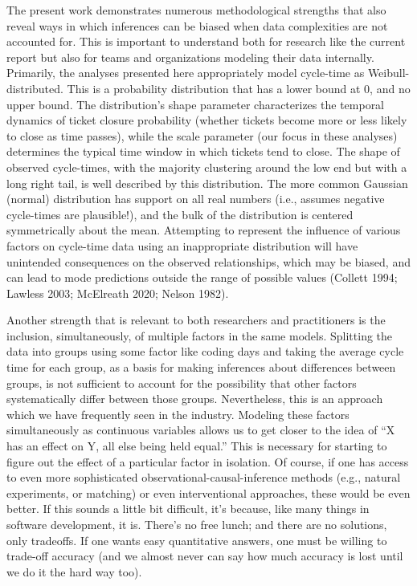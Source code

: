 \documentclass[
]{article}
\begin{document}
The present work demonstrates numerous methodological strengths that
also reveal ways in which inferences can be biased when data
complexities are not accounted for. This is important to understand both
for research like the current report but also for teams and
organizations modeling their data internally. Primarily, the analyses
presented here appropriately model cycle-time as Weibull-distributed.
This is a probability distribution that has a lower bound at 0, and no
upper bound. The distribution's shape parameter characterizes the
temporal dynamics of ticket closure probability (whether tickets become
more or less likely to close as time passes), while the scale parameter
(our focus in these analyses) determines the typical time window in
which tickets tend to close. The shape of observed cycle-times, with the
majority clustering around the low end but with a long right tail, is
well described by this distribution. The more common Gaussian (normal)
distribution has support on all real numbers (i.e., assumes negative
cycle-times are plausible!), and the bulk of the distribution is
centered symmetrically about the mean. Attempting to represent the
influence of various factors on cycle-time data using an inappropriate
distribution will have unintended consequences on the observed
relationships, which may be biased, and can lead to mode predictions
outside the range of possible values (Collett 1994; Lawless 2003;
McElreath 2020; Nelson 1982).

Another strength that is relevant to both researchers and practitioners
is the inclusion, simultaneously, of multiple factors in the same
models. Splitting the data into groups using some factor like coding
days and taking the average cycle time for each group, as a basis for
making inferences about differences between groups, is not sufficient to
account for the possibility that other factors systematically differ
between those groups. Nevertheless, this is an approach which we have
frequently seen in the industry. Modeling these factors simultaneously
as continuous variables allows us to get closer to the idea of ``X has
an effect on Y, all else being held equal.'' This is necessary for
starting to figure out the effect of a particular factor in isolation.
Of course, if one has access to even more sophisticated
observational-causal-inference methods (e.g., natural experiments, or
matching) or even interventional approaches, these would be even better.
If this sounds a little bit difficult, it's because, like many things in
software development, it is. There's no free lunch; and there are no
solutions, only tradeoffs. If one wants easy quantitative answers, one
must be willing to trade-off accuracy (and we almost never can say how
much accuracy is lost until we do it the hard way too).
\end{document}

